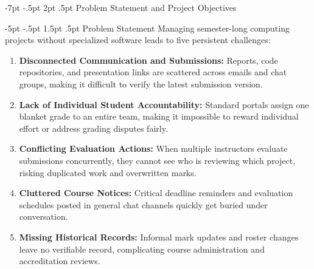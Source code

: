 \documentclass[11pt,a4paper]{article}
\makeatletter
\renewcommand\section{\@startsection {section}{1}{\z@}%
  {-7pt \@plus -1.5pt \@minus -.5pt}%
  {2pt \@plus .5pt}%
  {\normalfont\large\bfseries\color{nexaNavy}}}
\renewcommand\subsection{\@startsection{subsection}{2}{\z@}%
  {-5pt \@plus -1pt \@minus -.5pt}%
  {1.5pt \@plus .5pt}%
  {\normalfont\normalsize\bfseries\color{nexaSlate}}}
\makeatother
\begin{document}
\clearpage

\section{Problem Statement and Project Objectives}

\subsection{Problem Statement}
Managing semester-long computing projects without specialized software leads to five persistent challenges:
\begin{enumerate}
  \item \textbf{Disconnected Communication and Submissions:} Reports, code repositories, and presentation links are scattered across emails and chat groups, making it difficult to verify the latest submission version.
  \item \textbf{Lack of Individual Student Accountability:} Standard portals assign one blanket grade to an entire team, making it impossible to reward individual effort or address grading disputes fairly.
  \item \textbf{Conflicting Evaluation Actions:} When multiple instructors evaluate submissions concurrently, they cannot see who is reviewing which project, risking duplicated work and overwritten marks.
  \item \textbf{Cluttered Course Notices:} Critical deadline reminders and evaluation schedules posted in general chat channels quickly get buried under conversation.
  \item \textbf{Missing Historical Records:} Informal mark updates and roster changes leave no verifiable record, complicating course administration and accreditation reviews.
\end{enumerate}
\end{document}
